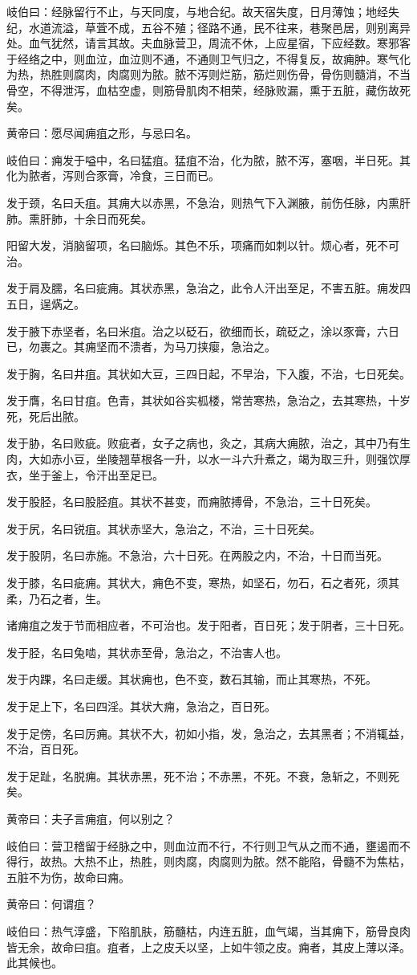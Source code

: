 \documentclass[a4paper,12pt,UTF8,twoside]{ctexbook}
\begin{document}
	岐伯曰：经脉留行不止，与天同度，与地合纪。故天宿失度，日月薄蚀；地经失纪，水道流溢，草萓不成，五谷不殖；径路不通，民不往来，巷聚邑居，则别离异处。血气犹然，请言其故。夫血脉营卫，周流不休，上应星宿，下应经数。寒邪客于经络之中，则血泣，血泣则不通，不通则卫气归之，不得复反，故痈肿。寒气化为热，热胜则腐肉，肉腐则为脓。脓不泻则烂筋，筋烂则伤骨，骨伤则髓消，不当骨空，不得泄泻，血枯空虚，则筋骨肌肉不相荣，经脉败漏，熏于五脏，藏伤故死矣。
	
	黄帝曰：愿尽闻痈疽之形，与忌曰名。
	
	岐伯曰：痈发于嗌中，名曰猛疽。猛疽不治，化为脓，脓不泻，塞咽，半日死。其化为脓者，泻则合豕膏，冷食，三日而已。
	
	发于颈，名曰夭疽。其痈大以赤黑，不急治，则热气下入渊腋，前伤任脉，内熏肝肺。熏肝肺，十余日而死矣。
	
	阳留大发，消脑留项，名曰脑烁。其色不乐，项痛而如刺以针。烦心者，死不可治。
	
	发于肩及臑，名曰疵痈。其状赤黑，急治之，此令人汗出至足，不害五脏。痈发四五日，逞焫之。
	
	发于腋下赤坚者，名曰米疽。治之以砭石，欲细而长，疏砭之，涂以豕膏，六日已，勿裹之。其痈坚而不溃者，为马刀挟瘿，急治之。
	
	发于胸，名曰井疽。其状如大豆，三四日起，不早治，下入腹，不治，七日死矣。
	
	发于膺，名曰甘疽。色青，其状如谷实柧楼，常苦寒热，急治之，去其寒热，十岁死，死后出脓。
	
	发于胁，名曰败疵。败疵者，女子之病也，灸之，其病大痈脓，治之，其中乃有生肉，大如赤小豆，坐陵翘草根各一升，以水一斗六升煮之，竭为取三升，则强饮厚衣，坐于釜上，令汗出至足已。
	
	发于股胫，名曰股胫疽。其状不甚变，而痈脓搏骨，不急治，三十日死矣。
	
	发于尻，名曰锐疽。其状赤坚大，急治之，不治，三十日死矣。
	
	发于股阴，名曰赤施。不急治，六十日死。在两股之内，不治，十日而当死。
	
	发于膝，名曰疵痈。其状大，痈色不变，寒热，如坚石，勿石，石之者死，须其柔，乃石之者，生。
	
	诸痈疽之发于节而相应者，不可治也。发于阳者，百日死；发于阴者，三十日死。
	
	发于胫，名曰兔啮，其状赤至骨，急治之，不治害人也。
	
	发于内踝，名曰走缓。其状痈也，色不变，数石其输，而止其寒热，不死。
	
	发于足上下，名曰四淫。其状大痈，急治之，百日死。
	
	发于足傍，名曰厉痈。其状不大，初如小指，发，急治之，去其黑者；不消辄益，不治，百日死。
	
	发于足趾，名脱痈。其状赤黑，死不治；不赤黑，不死。不衰，急斩之，不则死矣。
	
	黄帝曰：夫子言痈疽，何以别之？
	
	岐伯曰：营卫稽留于经脉之中，则血泣而不行，不行则卫气从之而不通，壅遏而不得行，故热。大热不止，热胜，则肉腐，肉腐则为脓。然不能陷，骨髓不为焦枯，五脏不为伤，故命曰痈。
	
	黄帝曰：何谓疽？
	
	岐伯曰：热气淳盛，下陷肌肤，筋髓枯，内连五脏，血气竭，当其痈下，筋骨良肉皆无余，故命曰疽。疽者，上之皮夭以坚，上如牛领之皮。痈者，其皮上薄以泽。此其候也。
	
\end{document}
